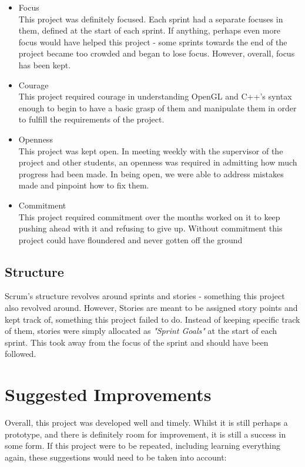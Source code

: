 \documentclass[a4paper,10pt]{report}
\begin{document}
\begin{itemize}
    \item Focus\\
    This project was definitely focused. Each sprint had a separate focuses in them, defined at the start of each sprint. If anything, perhaps even more focus would have helped this project - some sprints towards the end of the project became too crowded and began to lose focus. However, overall, focus has been kept.
    \item Courage\\
    This project required courage in understanding OpenGL and C++'s syntax enough to begin to have a basic grasp of them and manipulate them in order to fulfill the requirements of the project. 
    \item Openness\\
    This project was kept open. In meeting weekly with the supervisor of the project and other students, an openness was required in admitting how much progress had been made. In being open, we were able to address mistakes made and pinpoint how to fix them. 
    \item Commitment\\
    This project required commitment over the months worked on it to keep pushing ahead with it and refusing to give up. Without commitment this project could have floundered and never gotten off the ground
\end{itemize}

\subsection{Structure}
Scrum's structure revolves around sprints and stories - something this project also revolved around. However, Stories are meant to be assigned story points and kept track of, something this project failed to do. Instead of keeping specific track of them, stories were simply allocated as \textit{"Sprint Goals"} at the start of each sprint. This took away from the focus of the sprint and should have been followed.

\section{Suggested Improvements}
Overall, this project was developed well and timely. Whilst it is still perhaps a prototype, and there is definitely room for improvement, it is still a success in some form. If this project were to be repeated, including learning everything again, these suggestions would need to be taken into account:
\end{document}

